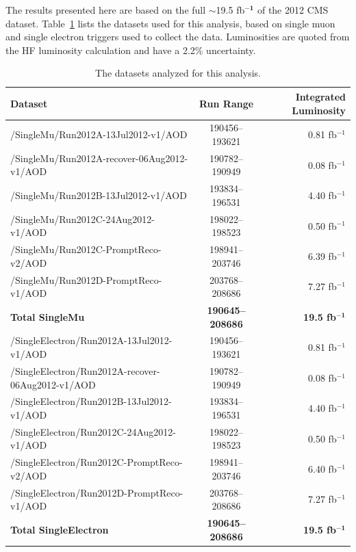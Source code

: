 \par \par The results presented here are based on the full $\sim$19.5
fb$\mathbf{^{-1}}$ of the 2012 CMS dataset.
Table~\ref{tab:dataSamples} lists the datasets used for this analysis,
based on single muon and single electron triggers used to collect the
data.  Luminosities are quoted from the HF luminosity calculation and
have a 2.2\% uncertainty.  

\begin{table}[hbtp]\footnotesize
\centering
\begin{tabular}{|l|c|r|}
\hline\hline
 Dataset & Run Range & Integrated Luminosity \\
\hline
/SingleMu/Run2012A-13Jul2012-v1/AOD & 190456--193621 & 0.81 fb$^{-1}$ \\
/SingleMu/Run2012A-recover-06Aug2012-v1/AOD & 190782--190949 & 0.08 fb$^{-1}$ \\
/SingleMu/Run2012B-13Jul2012-v1/AOD & 193834--196531 & 4.40 fb$^{-1}$ \\
/SingleMu/Run2012C-24Aug2012-v1/AOD & 198022--198523 & 0.50 fb$^{-1}$ \\
/SingleMu/Run2012C-PromptReco-v2/AOD & 198941--203746 & 6.39 fb$^{-1}$ \\
/SingleMu/Run2012D-PromptReco-v1/AOD & 203768--208686 & 7.27 fb$^{-1}$ \\
{\bf Total SingleMu} & {\bf 190645--208686} & {\bf 19.5 fb$\mathbf{^{-1}}$} \\
\hline
/SingleElectron/Run2012A-13Jul2012-v1/AOD & 190456--193621 & 0.81 fb$^{-1}$ \\
/SingleElectron/Run2012A-recover-06Aug2012-v1/AOD & 190782--190949 & 0.08 fb$^{-1}$ \\
/SingleElectron/Run2012B-13Jul2012-v1/AOD & 193834--196531 & 4.40 fb$^{-1}$ \\
/SingleElectron/Run2012C-24Aug2012-v1/AOD & 198022--198523 & 0.50 fb$^{-1}$ \\
/SingleElectron/Run2012C-PromptReco-v2/AOD & 198941--203746 & 6.40 fb$^{-1}$ \\
/SingleElectron/Run2012D-PromptReco-v1/AOD & 203768--208686 & 7.27 fb$^{-1}$\\
{\bf Total SingleElectron} & {\bf 190645--208686} & {\bf 19.5 fb$\mathbf{^{-1}}$} \\
\hline

\hline\hline
\end{tabular}
\caption{The datasets analyzed for this analysis.}
\label{tab:dataSamples}
\end{table}

